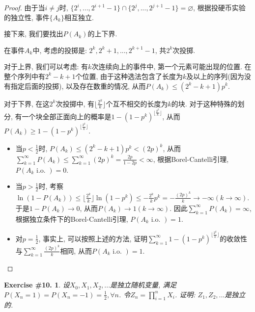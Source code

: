 \documentclass[UTF8, a4paper]{article}
\newtheorem{exercise}{Exercise \#10.}
\begin{document}
\begin{proof}
由于当\(i\neq j\)时, \(\{2^i, ..., 2^{i+1} - 1\} \cap \{2^j, ..., 2^{j+1} - 1\} = \varnothing\), 根据投硬币实验的独立性, 事件\(\{A_k\}\)相互独立.

接下来, 我们要找出\(P(A_k)\)的上下界.

在事件\(A_k\)中, 考虑的投掷是: \(2^k, 2^k+1, ..., 2^{k+1} - 1\), 共\(2^k\)次投掷.

对于上界, 我们可以考虑: 有\(k\)次连续向上的事件中, 第一个元素可能出现的位置. 在整个序列中有\(2^k - k + 1\)个位置, 由于这种选法包含了长度为\(k\)及以上的序列(因为没有指定后面的投掷), 以及存在数重的情况, 从而\(P(A_k) \leq (2^k - k + 1)p^k\).

对于下界, 在这\(2^k\)次投掷中, 有\(\lfloor \frac{2^k}{k}\rfloor\)个互不相交的长度为\(k\)的块.
对于这种特殊的划分, 有一个块全部正面向上的概率是\(1 - (1 - p^k)^{\lfloor \frac{2^k}{k}\rfloor}\), 从而
\(P(A_k) \geq 1 - (1 - p^k)^{\lfloor \frac{2^k}{k}\rfloor}\).

\begin{itemize}
    \item 当\(p < \frac{1}{2}\)时, \(P(A_k) \leq (2^k - k + 1) p^k <(2p)^k\), 从而\(\sum_{k=1}^{\infty} P(A_k) \leq \sum_{k=1}^{\infty} (2p)^k = \frac{2p}{1-2p} < \infty\), 根据Borel-Cantelli引理, \(P(A_k \text{ i.o. }) = 0\).
    \item 当\(p > \frac{1}{2}\)时, 考察\(\ln(1 - P(A_k)) \leq \lfloor \frac{2^k}{k} \rfloor \ln(1 - p^k) \leq -\frac{2^k}{k}p^k = -\frac{(2p)^k}{k} \to -\infty(k \to \infty)\). 于是\(1 - P(A_k) \to 0\), 从而\(P(A_k) \to 1(k \to \infty)\). 因此\(\sum_{k=1}^{\infty}P(A_k) = \infty\), 根据独立条件下的Borel-Cantelli引理, \(P(A_k \text{ i.o. }) = 1\).
    \item 对\(p = \frac{1}{2}\), 事实上, 可以按照上述的方法, 证明\(\sum_{k = 1}^{\infty} 1 - (1- p^k)^{\lfloor \frac{2^k}{k} \rfloor}\)的收敛性与\(\sum_{k= 1}^{\infty} \frac{(2p)^k}{k}\)相同, 从而\(P(A_k \text{ i.o. }) = 1\).
\end{itemize}

\end{proof}




\begin{framed}
\begin{exercise}
设\(X_0, X_1, X_2, ...\)是独立随机变量, 满足\(P(X_n = 1) = P(X_n = -1) = \frac{1}{2}, \forall n\).
令\(Z_n = \prod_{i=1}^{n}X_i\).
证明: \(Z_1, Z_2, ...\)是独立的.
\end{exercise}
\end{framed}
\end{document}
